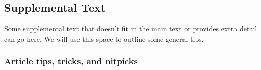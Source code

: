 \subsection*{Supplemental Text}

Some supplemental text that doesn't fit in the main text or provides extra detail can go here. We will use this space to outline some general tips.

\subsubsection*{Article tips, tricks, and nitpicks}
\generalTips